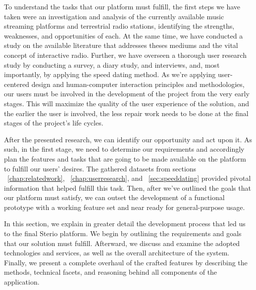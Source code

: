 \cleardoublepage
\label{chap:steriosystem}

To understand the tasks that our platform must fulfill, the first steps we have taken were an investigation and analysis of the currently available music streaming platforms and terrestrial radio stations, identifying the strengths, weaknesses, and opportunities of each. At the same time, we have conducted a study on the available literature that addresses theses mediums and the vital concept of interactive radio. Further, we have overseen a thorough user research study by conducting a survey, a diary study, and interviews, and, most importantly, by applying the speed dating method. As we're applying user-centered design and human-computer interaction principles and methodologies, our users must be involved in the development of the project from the very early stages. This will maximize the quality of the user experience of the solution, and the earlier the user is involved, the less repair work needs to be done at the final stages of the project's life cycles.~\cite{Courage2005}

After the presented research, we can identify our opportunity and act upon it. As such, in the first stage, we need to determine our requirements and accordingly plan the features and tasks that are going to be made available on the platform to fulfill our users' desires. The gathered datasets from sections ~\ref{chap:relatedwork}, ~\ref{chap:userresearch}, and ~\ref{sec:speeddating} provided pivotal information that helped fulfill this task. Then, after we've outlined the goals that our platform must satisfy, we can outset the development of a functional prototype with a working feature set and near ready for general-purpose usage.

In this section, we explain in greater detail the development process that led us to the final Sterio platform. We begin by outlining the requirements and goals that our solution must fulfill. Afterward, we discuss and examine the adopted technologies and services, as well as the overall architecture of the system. Finally, we present a complete overhaul of the crafted features by describing the methods, technical facets, and reasoning behind all components of the application.


